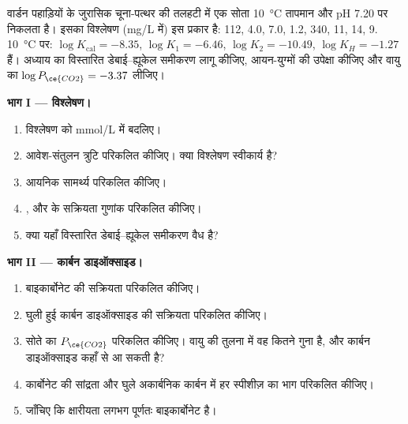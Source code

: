 \begin{problem}
\label{pb:b3:water-rock-interaction:1}
वार्डन पहाड़ियों के जुरासिक चूना-पत्थर की तलहटी में एक सोता
\qty{10}{\celsius} तापमान और pH 7.20 पर निकलता है। इसका विश्लेषण (\unit{mg/L} में) इस प्रकार है: 
112,  4.0,  7.0,  1.2,  340,  11,
 14,  9. \qty{10}{\celsius} पर: $\log K_{\mathrm{cal}} =
-8.35$, $\log K_1 = -6.46$, $\log K_2 = -10.49$, $\log K_H = -1.27$ हैं।
अध्याय का विस्तारित डेबाई--ह्यूकेल समीकरण लागू कीजिए, आयन-युग्मों की उपेक्षा कीजिए और
वायु का $\log P_{\ce{CO2}} = -3.37$ लीजिए।

\medskip\noindent\textbf{भाग I --- विश्लेषण।}
\begin{enumerate}
\item विश्लेषण को \unit{mmol/L} में बदलिए।
\item आवेश-संतुलन त्रुटि परिकलित कीजिए। क्या विश्लेषण स्वीकार्य है?
\item आयनिक सामर्थ्य परिकलित कीजिए।
\item {},  और
   के सक्रियता गुणांक परिकलित कीजिए।
\item क्या यहाँ विस्तारित डेबाई--ह्यूकेल समीकरण वैध है?
\end{enumerate}

\medskip\noindent\textbf{भाग II --- कार्बन डाइऑक्साइड।}
\begin{enumerate}[resume]
\item बाइकार्बोनेट की सक्रियता परिकलित कीजिए।
\item घुली हुई कार्बन डाइऑक्साइड की सक्रियता परिकलित कीजिए।
\item सोते का $P_{\ce{CO2}}$ परिकलित कीजिए। वायु की तुलना में वह कितने गुना है,
  और कार्बन डाइऑक्साइड कहाँ से आ सकती है?
\item कार्बोनेट की सांद्रता और घुले अकार्बनिक कार्बन में हर स्पीशीज़ का
  भाग परिकलित कीजिए।
\item जाँचिए कि क्षारीयता लगभग पूर्णतः बाइकार्बोनेट है।
\end{enumerate}


\end{problem}
